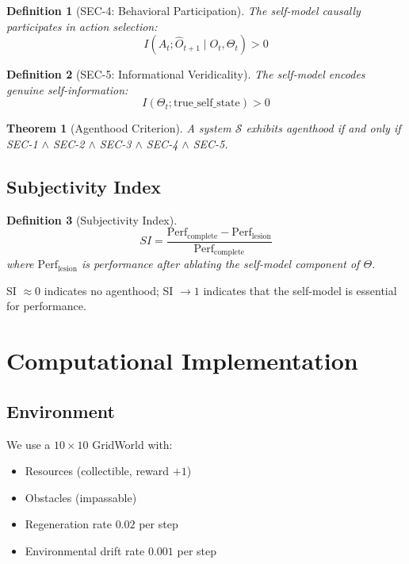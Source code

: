 \documentclass[11pt,a4paper]{article}
\newtheorem{definition}{Definition}
\newtheorem{theorem}{Theorem}
\begin{document}
\begin{definition}[SEC-4: Behavioral Participation]
The self-model causally participates in action selection:
$$I(A_t; \hat{O}_{t+1} \mid O_t, \Theta_t) > 0$$
\end{definition}

\begin{definition}[SEC-5: Informational Veridicality]
The self-model encodes genuine self-information:
$$I(\Theta_t; \text{true\_self\_state}) > 0$$
\end{definition}

\begin{theorem}[Agenthood Criterion]
A system $\mathcal{S}$ exhibits agenthood if and only if SEC-1 $\land$ SEC-2 $\land$ SEC-3 $\land$ SEC-4 $\land$ SEC-5.
\end{theorem}

\subsection{Subjectivity Index}

\begin{definition}[Subjectivity Index]
$$SI = \frac{\text{Perf}_{\text{complete}} - \text{Perf}_{\text{lesion}}}{\text{Perf}_{\text{complete}}}$$
where $\text{Perf}_{\text{lesion}}$ is performance after ablating the self-model component of $\Theta$.
\end{definition}

SI $\approx 0$ indicates no agenthood; SI $\to 1$ indicates that the self-model is essential for performance.

\section{Computational Implementation}

\subsection{Environment}

We use a $10 \times 10$ GridWorld with:
\begin{itemize}
    \item Resources (collectible, reward $+1$)
    \item Obstacles (impassable)
    \item Regeneration rate $0.02$ per step
    \item Environmental drift rate $0.001$ per step
\end{itemize}
\end{document}
